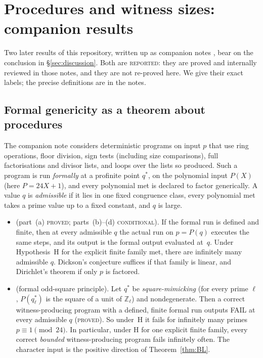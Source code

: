 \documentclass[11pt,reqno]{amsart}
\theoremstyle{definition}
\newcommand{\Z}{\mathbb Z}
\newcommand{\status}[1]{\textsc{#1}}
\begin{document}
\section{Procedures and witness sizes: companion results}\label{sec:companion}

Two later results of this repository, written up as companion notes
\cite{PS,PO3}, bear on the conclusion in \S\ref{sec:discussion}.  Both are
\status{reported}: they are proved and internally reviewed in those notes,
and they are not re-proved here.  We give their exact labels; the precise
definitions are in the notes.

\subsection{Formal genericity as a theorem about procedures}
The companion note \cite[\S1]{PS} considers deterministic programs on input
$p$ that use ring operations, floor division, sign tests (including size
comparisons), full factorisations and divisor lists, and loops over the
lists so produced.  Such a program is run \emph{formally} at a profinite
point $q^*$, on the polynomial input $P(X)$ (here $P=24X+1$), and every
polynomial met is declared to factor generically.  A value $q$ is
\emph{admissible} if it lies in one fixed congruence class, every
polynomial met takes a prime value up to a fixed constant, and $q$ is
large.
\begin{itemize}
\item \emph{\cite[Theorem~M]{PS}} (part~(a) \status{proved}; parts~(b)--(d)
\status{conditional}).  If the formal run is defined and finite, then at
every admissible $q$ the actual run on $p=P(q)$ executes the same steps,
and its output is the formal output evaluated at~$q$.  Under Hypothesis~H
for the explicit finite family met, there are infinitely many admissible
$q$.  Dickson's conjecture suffices if that family is linear, and
Dirichlet's theorem if only $p$ is factored.
\item \emph{\cite[Theorem~C, Corollary~C1]{PS}} (formal odd-square
principle).  Let $q^*$ be \emph{square-mimicking} (for every prime $\ell$,
$P(q^*_\ell)$ is the square of a unit of $\Z_\ell$) and nondegenerate.
Then a correct witness-producing program with a defined, finite formal run
outputs FAIL at every admissible $q$ (\status{proved}).  So under~H it
fails for infinitely many primes $p\equiv1\pmod{24}$.  In particular, under
H for one explicit finite family, every correct \emph{bounded}
witness-producing program fails infinitely often.  The character input is
the positive direction of Theorem~\ref{thm:BL}.
\end{itemize}
\end{document}
